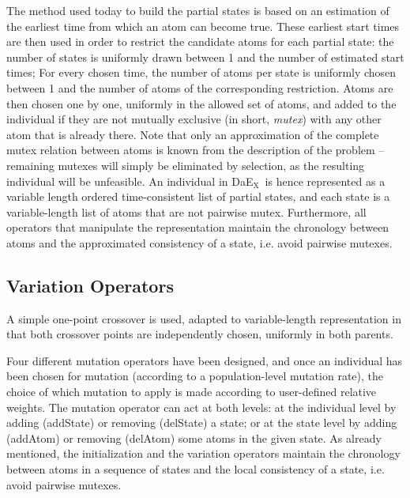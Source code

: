 \documentclass{llncs}
\def\DAEX{{\sc DaE$_{\text{X}}$}}
\begin{document}
The method used today to build the partial states is based on an estimation of the earliest time from which an atom can become true. %
These earliest start times are then used in order to restrict the candidate atoms for each partial state:
the number of states is uniformly drawn between 1 and the number of estimated start times; For every chosen time, the number of atoms per state is uniformly chosen between 1 and the number of atoms of the corresponding restriction.
Atoms are then chosen one by one, uniformly in the allowed set of atoms, and added to the individual if they are not mutually exclusive (in short, {\em mutex}) with any other atom that is already there. Note that only an approximation of the complete mutex relation between atoms is known from the description of the problem -- remaining mutexes will simply be eliminated by selection, as the resulting individual will be unfeasible. 
An individual in \DAEX\ is hence represented as a variable length ordered time-consistent list of partial states, and each state is a variable-length list of atoms that are not pairwise mutex. Furthermore, all operators that manipulate the representation maintain the chronology between atoms and the approximated consistency of a state, i.e. avoid pairwise mutexes.

\subsection{Variation Operators }

A simple one-point crossover is used, adapted to variable-length representation in that both crossover points are independently chosen, uniformly in both parents.

Four different mutation operators have been designed, and once an individual has been chosen for mutation (according to a population-level mutation rate),
the choice of which mutation to apply is made according to user-defined relative weights.
The mutation operator can act at both levels: at the individual level by adding (addState) or removing (delState) a state; or at the state level by adding (addAtom) or removing (delAtom) some atoms in the given
state. As already mentioned, the initialization and the variation operators maintain the chronology between atoms in a sequence of states and the local consistency 
of a state, i.e. avoid pairwise mutexes.
\end{document}

